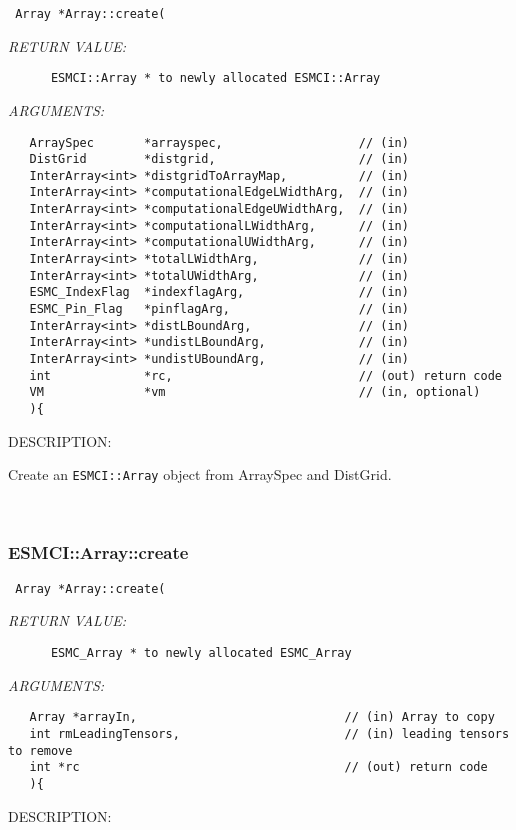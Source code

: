   
\begin{verbatim} Array *Array::create(\end{verbatim}{\em RETURN VALUE:}
\begin{verbatim}      ESMCI::Array * to newly allocated ESMCI::Array\end{verbatim}{\em ARGUMENTS:}
\begin{verbatim}   ArraySpec       *arrayspec,                   // (in)
   DistGrid        *distgrid,                    // (in)
   InterArray<int> *distgridToArrayMap,          // (in)
   InterArray<int> *computationalEdgeLWidthArg,  // (in)
   InterArray<int> *computationalEdgeUWidthArg,  // (in)
   InterArray<int> *computationalLWidthArg,      // (in)
   InterArray<int> *computationalUWidthArg,      // (in)
   InterArray<int> *totalLWidthArg,              // (in)
   InterArray<int> *totalUWidthArg,              // (in)
   ESMC_IndexFlag  *indexflagArg,                // (in)
   ESMC_Pin_Flag   *pinflagArg,                  // (in)
   InterArray<int> *distLBoundArg,               // (in)
   InterArray<int> *undistLBoundArg,             // (in)
   InterArray<int> *undistUBoundArg,             // (in)
   int             *rc,                          // (out) return code
   VM              *vm                           // (in, optional)
   ){\end{verbatim}
{\sf DESCRIPTION:\\ }


      Create an {\tt ESMCI::Array} object from ArraySpec and DistGrid. 
 
\mbox{}\hrulefill\
 
\subsubsection [ESMCI::Array::create] {ESMCI::Array::create}


  
\begin{verbatim} Array *Array::create(\end{verbatim}{\em RETURN VALUE:}
\begin{verbatim}      ESMC_Array * to newly allocated ESMC_Array\end{verbatim}{\em ARGUMENTS:}
\begin{verbatim}   Array *arrayIn,                             // (in) Array to copy
   int rmLeadingTensors,                       // (in) leading tensors to remove
   int *rc                                     // (out) return code
   ){\end{verbatim}
{\sf DESCRIPTION:\\ }


